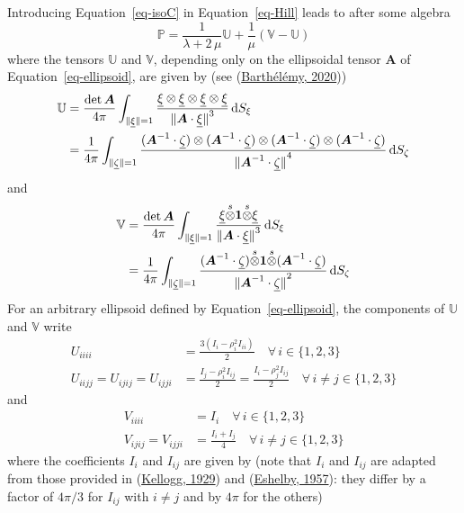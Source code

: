 \documentclass[
  letterpaper,
  DIV=11,
  numbers=noendperiod]{scrreprt}
\begin{document}
Introducing Equation~\ref{eq-isoC} in Equation~\ref{eq-Hill} leads to
after some algebra \[
{\mathbb{{P}}}=
\frac{1}{\lambda+2\,\mu}
{\mathbb{{U}}}
+\frac{1}{\mu}({\mathbb{{V}}}-{\mathbb{{U}}})
\] where the tensors \({\mathbb{{U}}}\) and \({\mathbb{{V}}}\),
depending only on the ellipsoidal tensor \({\mathbf{\boldsymbol{{A}}}}\)
of Equation~\ref{eq-ellipsoid}, are given by (see
(\protect\hyperlink{ref-barthelemy2020}{Barthélémy, 2020}))
\[\begin{aligned}
{\mathbb{{U}}} &= \frac{\det{{\mathbf{\boldsymbol{{A}}}}}}{4\pi}
\int_{{\lVert{{{\underline{{\xi}}}}}\rVert}=1}
\frac{{\underline{{\xi}}}\otimes{\underline{{\xi}}}\otimes{\underline{{\xi}}}\otimes{\underline{{\xi}}}}
{{\lVert{{{\mathbf{\boldsymbol{{A}}}}\cdot{\underline{{\xi}}}}}\rVert}^3}{\,\mathrm{d}}S_{\xi}\\
&=
\frac{1}{4\pi}
\int_{{\lVert{{{\underline{{\zeta}}}}}\rVert}=1}
\frac{%
({\mathbf{\boldsymbol{{A}}}}^{-1}\cdot{\underline{{\zeta}}})
\otimes
({\mathbf{\boldsymbol{{A}}}}^{-1}\cdot{\underline{{\zeta}}})
\otimes
({\mathbf{\boldsymbol{{A}}}}^{-1}\cdot{\underline{{\zeta}}})
\otimes
({\mathbf{\boldsymbol{{A}}}}^{-1}\cdot{\underline{{\zeta}}})
}{{\lVert{{{\mathbf{\boldsymbol{{A}}}}^{-1}\cdot{\underline{{\zeta}}}}}\rVert}^4}
{\,\mathrm{d}}S_{\zeta}
\end{aligned}\] and \[\begin{aligned}
{\mathbb{{V}}} &= \frac{\det{{\mathbf{\boldsymbol{{A}}}}}}{4\pi}
\int_{{\lVert{{{\underline{{\xi}}}}}\rVert}=1}
\frac{{\underline{{\xi}}}{\stackrel{s}{\otimes}}{\mathbf{\boldsymbol{{1}}}}{\stackrel{s}{\otimes}}{\underline{{\xi}}}}
{{\lVert{{{\mathbf{\boldsymbol{{A}}}}\cdot{\underline{{\xi}}}}}\rVert}^3}{\,\mathrm{d}}S_{\xi}\\
&=
\frac{1}{4\pi}
\int_{{\lVert{{{\underline{{\zeta}}}}}\rVert}=1}
\frac{%
({\mathbf{\boldsymbol{{A}}}}^{-1}\cdot{\underline{{\zeta}}})
{\stackrel{s}{\otimes}}
{\mathbf{\boldsymbol{{1}}}}
{\stackrel{s}{\otimes}}
({\mathbf{\boldsymbol{{A}}}}^{-1}\cdot{\underline{{\zeta}}})
}{{\lVert{{{\mathbf{\boldsymbol{{A}}}}^{-1}\cdot{\underline{{\zeta}}}}}\rVert}^2}
{\,\mathrm{d}}S_{\zeta}
\end{aligned}\] For an arbitrary ellipsoid defined by
Equation~\ref{eq-ellipsoid}, the components of \({\mathbb{{U}}}\) and
\({\mathbb{{V}}}\) write \[\begin{aligned}
U_{iiii}&=\frac{3(I_i-\rho_i^2I_{ii})}{2} 
\quad\forall\, i\in\{1,2,3\}\\
U_{iijj}=U_{ijij}=U_{ijji}&=\frac{I_j-\rho_i^2I_{ij}}{2} 
=\frac{I_i-\rho_j^2I_{ij}}{2}
\quad\forall\, i\neq j\in\{1,2,3\}
\end{aligned}\] and \[\begin{aligned}
V_{iiii}&=I_i\quad\forall\, i\in\{1,2,3\}\\
V_{ijij}=V_{ijji}&=\frac{I_i+I_j}{4}
\quad\forall\, i\neq j\in\{1,2,3\}
\end{aligned}\] where the coefficients \(I_i\) and \(I_{ij}\) are given
by (note that \(I_i\) and \(I_{ij}\) are adapted from those provided in
(\protect\hyperlink{ref-kellogg1929}{Kellogg, 1929}) and
(\protect\hyperlink{ref-eshelby1957}{Eshelby, 1957}): they differ by a
factor of \(4\pi/3\) for \(I_{ij}\) with \(i\neq j\) and by \(4\pi\) for
the others)
\end{document}
